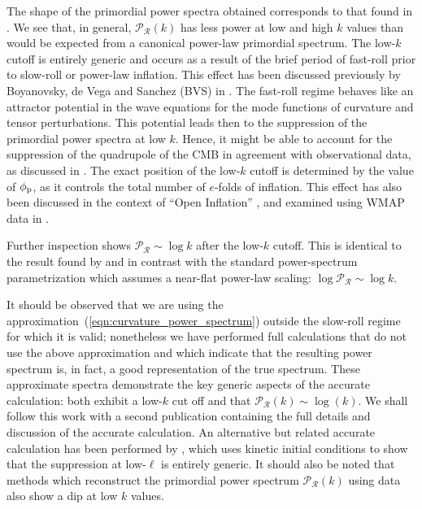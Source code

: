 The shape of the primordial power spectra obtained corresponds to that found in \citep{lasenby_closed_2003}. We see that, in general, $\mathcal{P}_\mathcal{R}(k)$ has less power at low and high $k$ values than would be expected from a canonical power-law primordial spectrum.  The low-$k$ cutoff is entirely generic and occurs as a result of the brief period of fast-roll prior to slow-roll or power-law inflation.  This effect has been discussed previously by Boyanovsky, de Vega and Sanchez (BVS) in \citep{boyanovsky_cmb_2006}. The fast-roll regime behaves like an attractor potential in the wave equations for the mode functions of curvature and tensor perturbations. This potential leads then to the suppression of the primordial power spectra at low $k$.  Hence, it might be able to account for the suppression of the quadrupole of the CMB in agreement with observational data, as discussed in \citep{boyanovsky_cmb_2006-1}.  The exact position of the low-$k$ cutoff is determined by the value of $\phi_{\mathrm{p}}$, as it controls the total number of $e$-folds of inflation. This effect has also been discussed in the context of ``Open Inflation'' \citep{Yamauchi_strings_2011,Linde_open_1999,Linde_toy_1999}, and examined using WMAP data in \citet{Contaldi_suppress_2003}.

Further inspection shows $\mathcal{P}_\mathcal{R} \sim \log k$ after the low-$k$ cutoff. This is identical to the result found by \citet{lasenby_closed_2003} and in contrast with the standard power-spectrum parametrization which assumes a near-flat power-law scaling: $\log\mathcal{P}_\mathcal{R}\sim \log k$. 

 
It should be observed that we are using the approximation~(\ref{eqn:curvature_power_spectrum}) outside the slow-roll regime for which it is valid; nonetheless we have performed full calculations that do not use the above approximation and which indicate that the resulting power spectrum is, in fact, a good representation of the true spectrum. These approximate spectra demonstrate the key generic aspects of the accurate calculation: both exhibit a low-$k$ cut off and that $\mathcal{P}_\mathcal{R}(k) \sim \log(k)$.  We shall follow this work with a second publication containing the full details and discussion of the accurate calculation. An alternative but related accurate calculation has been performed by \citep{Lello_tensor_2013}, which uses kinetic initial conditions to show that the suppression at low-$\ell$ is entirely generic. It should also be noted that methods which reconstruct the primordial power spectrum $\mathcal{P}_\mathcal{R}(k)$ \citep{vazquez_reconstruction,Hazra_reconstruction_2013} using data also show a dip at low $k$ values.


